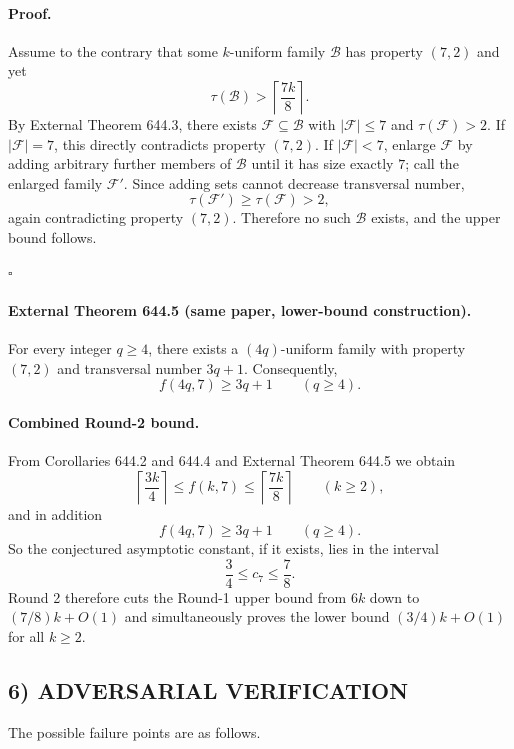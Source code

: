 \paragraph{Proof.}
Assume to the contrary that some $k$-uniform family $\mathcal B$ has property $(7,2)$ and yet
\[
\tau(\mathcal B) > \left\lceil \frac{7k}{8}\right\rceil.
\]
By External Theorem 644.3, there exists $\mathcal F\subseteq \mathcal B$ with $|\mathcal F|\le 7$ and $\tau(\mathcal F)>2$.
If $|\mathcal F|=7$, this directly contradicts property $(7,2)$.
If $|\mathcal F|<7$, enlarge $\mathcal F$ by adding arbitrary further members of $\mathcal B$ until it has size exactly $7$; call the enlarged family $\mathcal F'$.
Since adding sets cannot decrease transversal number,
\[
\tau(\mathcal F')\ge \tau(\mathcal F)>2,
\]
again contradicting property $(7,2)$.
Therefore no such $\mathcal B$ exists, and the upper bound follows.

\hfill$\square$

\paragraph{External Theorem 644.5 (same paper, lower-bound construction).}
For every integer $q\ge 4$, there exists a $(4q)$-uniform family with property $(7,2)$ and transversal number $3q+1$.
Consequently,
\[
 f(4q,7)\ge 3q+1
\qquad (q\ge 4).
\]

\paragraph{Combined Round-2 bound.}
From Corollaries 644.2 and 644.4 and External Theorem 644.5 we obtain
\[
\left\lceil \frac{3k}{4}\right\rceil
\le f(k,7)
\le \left\lceil \frac{7k}{8}\right\rceil
\qquad (k\ge 2),
\]
and in addition
\[
 f(4q,7)\ge 3q+1
\qquad (q\ge 4).
\]
So the conjectured asymptotic constant, if it exists, lies in the interval
\[
\frac34 \le c_7 \le \frac78.
\]
Round 2 therefore cuts the Round-1 upper bound from $6k$ down to $(7/8)k+O(1)$ and simultaneously proves the lower bound $(3/4)k+O(1)$ for all $k\ge 2$.

\subsection*{6) ADVERSARIAL VERIFICATION}
The possible failure points are as follows.

